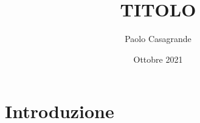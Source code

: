 \documentclass[12pt]{article}
\title{TITOLO}
\author{Paolo Casagrande}
\date{Ottobre 2021}
\begin{document}
\maketitle
\tableofcontents
\newpage

\section{Introduzione}
\end{document}
